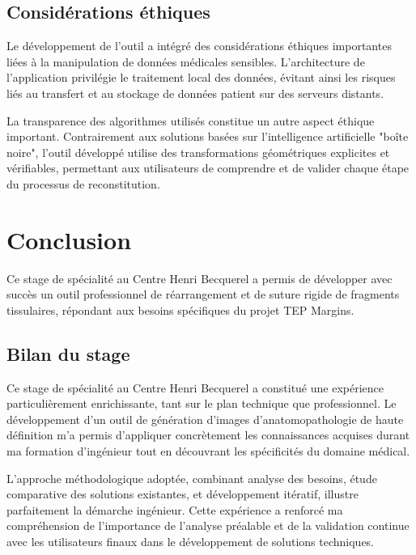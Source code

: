 \documentclass[12pt,a4paper]{report}
\let\oldchapter\chapter
\renewcommand{\chapter}{\clearpage\oldchapter}
\begin{document}
\begin{}
\begin{}
\begin{}
\begin{}
\section{Considérations éthiques}

Le développement de l'outil a intégré des considérations éthiques importantes liées à la manipulation de données médicales sensibles. L'architecture de l'application privilégie le traitement local des données, évitant ainsi les risques liés au transfert et au stockage de données patient sur des serveurs distants.

La transparence des algorithmes utilisés constitue un autre aspect éthique important. Contrairement aux solutions basées sur l'intelligence artificielle "boîte noire", l'outil développé utilise des transformations géométriques explicites et vérifiables, permettant aux utilisateurs de comprendre et de valider chaque étape du processus de reconstitution.

\chapter{Conclusion}

\clearpage

\vspace{0.5em}

\begin{center}
Ce stage de spécialité au Centre Henri Becquerel a permis de développer avec succès un outil professionnel de réarrangement et de suture rigide de fragments tissulaires, répondant aux besoins spécifiques du projet TEP Margins.
\end{center}

\vspace{1em}

\section{Bilan du stage}

Ce stage de spécialité au Centre Henri Becquerel a constitué une expérience particulièrement enrichissante, tant sur le plan technique que professionnel. Le développement d'un outil de génération d'images d'anatomopathologie de haute définition m'a permis d'appliquer concrètement les connaissances acquises durant ma formation d'ingénieur tout en découvrant les spécificités du domaine médical.

L'approche méthodologique adoptée, combinant analyse des besoins, étude comparative des solutions existantes, et développement itératif, illustre parfaitement la démarche ingénieur. Cette expérience a renforcé ma compréhension de l'importance de l'analyse préalable et de la validation continue avec les utilisateurs finaux dans le développement de solutions techniques.


\end{}
\end{}
\end{}
\end{}
\end{document}
